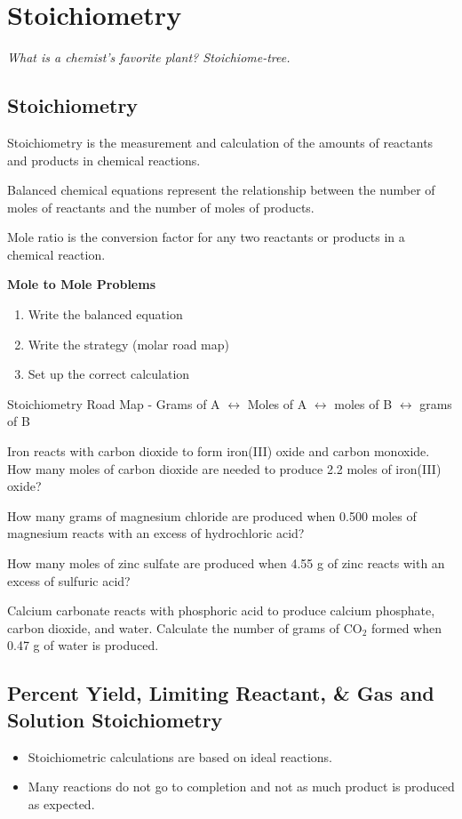 \documentclass[../hchem.tex]{subfiles}
\begin{document}
\chapter{Stoichiometry}
\textit{What is a chemist's favorite plant? Stoichiome-tree.}

\section{Stoichiometry}
Stoichiometry is the measurement and calculation of the amounts of reactants and products in chemical reactions.

Balanced chemical equations represent the relationship between the number of moles of reactants and the number of moles of products.

Mole ratio is the conversion factor for any two reactants or products in a chemical reaction.

\textbf{Mole to Mole Problems}
\begin{enumerate}
    \item Write the balanced equation 
    \item Write the strategy (molar road map)
    \item Set up the correct calculation
\end{enumerate}

Stoichiometry Road Map - Grams of A $\leftrightarrow$ Moles of A $\leftrightarrow$ moles of B $\leftrightarrow$ grams of B 

\ex Iron reacts with carbon dioxide to form iron(III) oxide and carbon monoxide. How many moles of carbon dioxide are needed to produce 2.2 moles of iron(III) oxide?

\ex How many grams of magnesium chloride are produced when 0.500 moles of magnesium reacts with an excess of hydrochloric acid? 

\ex How many moles of zinc sulfate are produced when 4.55 g of zinc reacts with an excess of sulfuric acid? 

\ex Calcium carbonate reacts with phosphoric acid to produce calcium phosphate, carbon dioxide, and water. 
Calculate the number of grams of CO$_2$ formed when 0.47 g of water is produced. 

\section{Percent Yield, Limiting Reactant, \& Gas and Solution Stoichiometry}
\begin{itemize}
    \item Stoichiometric calculations are based on ideal reactions.
    \item Many reactions do not go to completion and not as much product is produced as expected.
\end{itemize}
\end{document}
